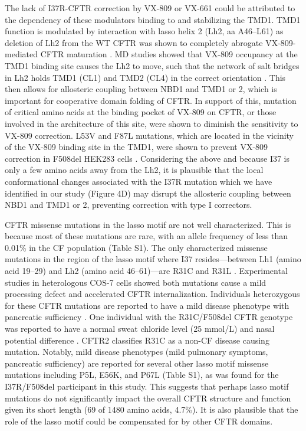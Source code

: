 The lack of I37R-CFTR correction by VX-809 or VX-661 could be attributed to the dependency of these modulators binding to and stabilizing the TMD1. TMD1 function is modulated by interaction with lasso helix 2 (Lh2, aa A46–L61) as deletion of Lh2 from the WT CFTR was shown to completely abrogate VX-809-mediated CFTR maturation \cite{sabusap2021}. MD studies showed that VX-809 occupancy at the TMD1 binding site causes the Lh2 to move, such that the network of salt bridges in Lh2 holds TMD1 (CL1) and TMD2 (CL4) in the correct orientation \cite{baatallah2021, okiyoneda2013}. This then allows for allosteric coupling between NBD1 and TMD1 or 2, which is important for cooperative domain folding of CFTR. In support of this, mutation of critical amino acids at the binding pocket of VX-809 on CFTR, or those involved in the architecture of this site, were shown to diminish the sensitivity to VX-809 correction. L53V and F87L mutations, which are located in the vicinity of the VX-809 binding site in the TMD1, were shown to prevent VX-809 correction in F508del HEK283 cells \cite{baatallah2021}. Considering the above and because I37 is only a few amino acids away from the Lh2, it is plausible that the local conformational changes associated with the I37R mutation which we have identified in our study (Figure 4D) may disrupt the allosteric coupling between NBD1 and TMD1 or 2, preventing correction with type I correctors.

CFTR missense mutations in the lasso motif are not well characterized. This is because most of these mutations are rare, with an allele frequency of less than 0.01\% in the CF population (Table S1). The only characterized missense mutations in the region of the lasso motif where I37 resides—between Lh1 (amino acid 19–29) and Lh2 (amino acid 46–61)—are R31C and R31L \cite{cftr2, jurkuvenaite2006}. Experimental studies in heterologous COS-7 cells showed both mutations cause a mild processing defect and accelerated CFTR internalization. Individuals heterozygous for these CFTR mutations are reported to have a mild disease phenotype with pancreatic sufficiency \cite{jurkuvenaite2006}. One individual with the R31C/F508del CFTR genotype was reported to have a normal sweat chloride level (25 mmol/L) and nasal potential difference \cite{werlin2015}. CFTR2 classifies R31C as a non-CF disease causing mutation. Notably, mild disease phenotypes (mild pulmonary symptoms, pancreatic sufficiency) are reported for several other lasso motif missense mutations including P5L, E56K, and P67L (Table S1), as was found for the I37R/F508del participant in this study. This suggests that perhaps lasso motif mutations do not significantly impact the overall CFTR structure and function given its short length (69 of 1480 amino acids, 4.7\%). It is also plausible that the role of the lasso motif could be compensated for by other CFTR domains.

